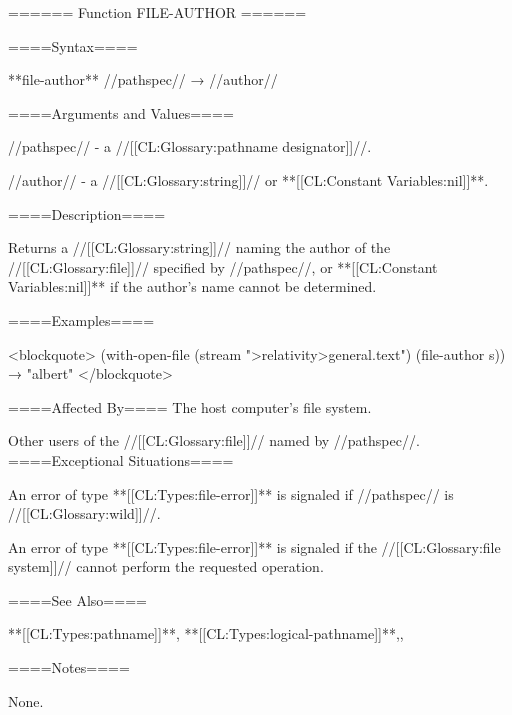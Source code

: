====== Function FILE-AUTHOR ======

====Syntax====

**file-author** //pathspec// → //author//

====Arguments and Values====

//pathspec// - a //[[CL:Glossary:pathname designator]]//.

//author// - a //[[CL:Glossary:string]]// or **[[CL:Constant Variables:nil]]**.

====Description====

Returns a //[[CL:Glossary:string]]// naming the author of the //[[CL:Glossary:file]]// specified by //pathspec//, or **[[CL:Constant Variables:nil]]** if the author's name cannot be determined.

====Examples====

<blockquote> (with-open-file (stream ">relativity>general.text") (file-author s)) → "albert" </blockquote>

====Affected By==== The host computer's file system.

Other users of the //[[CL:Glossary:file]]// named by //pathspec//. ====Exceptional Situations====

An error of type **[[CL:Types:file-error]]** is signaled if //pathspec// is //[[CL:Glossary:wild]]//.

An error of type **[[CL:Types:file-error]]** is signaled if the //[[CL:Glossary:file system]]// cannot perform the requested operation.

====See Also====

**[[CL:Types:pathname]]**, **[[CL:Types:logical-pathname]]**,{\secref\FileSystemConcepts},

{\secref\PathnamesAsFilenames}

====Notes====

None.


     
